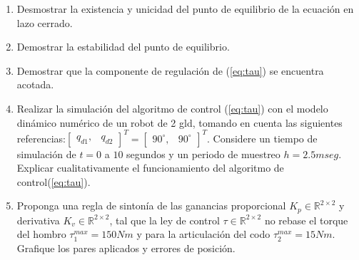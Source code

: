 \documentclass[12pt]{article}
\begin{document}
\begin{enumerate}
    \item Desmostrar la existencia y unicidad del punto de equilibrio de la ecuación en lazo cerrado.
    \item Demostrar la estabilidad del punto de equilibrio.
    \item Demostrar que la componente de regulación de (\ref{eq:tau}) se encuentra acotada.
    \item Realizar la simulación del algoritmo de control (\ref{eq:tau}) con el modelo dinámico numérico de un robot de 2 gld, tomando en cuenta las siguientes referencias:$\begin{bmatrix}
        q_{d1},&q_{d2}
    \end{bmatrix}^T=
    \begin{bmatrix}
    90^{\circ},&90^{\circ}
    \end{bmatrix}^T$. Considere un tiempo de simulación de $t=0$ a $10$ segundos y un periodo de muestreo $h=2.5mseg$. Explicar cualitativamente el funcionamiento del algoritmo de control(\ref{eq:tau}).
    \item Proponga una regla de sintonía de las ganancias proporcional $K_p\in \mathbb{R}^{2\times 2}$ y derivativa $K_v\in \mathbb{R}^{2\times 2}$, tal que la ley de control $\tau\in \mathbb{R}^{2\times 2}$ no rebase el torque del hombro $\tau^{max}_{1}=150Nm$ y para la articulación del codo $\tau^{max}_{2}=15Nm$. Grafique los pares aplicados y errores de posición.
\end{enumerate}
\end{document}
